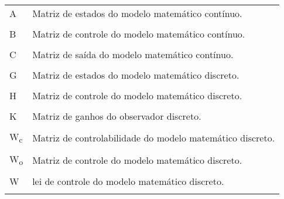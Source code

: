 \documentclass[a4paper,12pt]{article}
\begin{document}
\begin{tabular}{ l l }
A\hspace{1.5cm} & Matriz de estados do modelo matemático contínuo.\\
\phantom{a} & \phantom{a}\\
B\hspace{1.5cm} & Matriz de controle do modelo matemático contínuo.\\
\phantom{a} & \phantom{a}\\
C\hspace{1.5cm} & Matriz de saída do modelo matemático contínuo.\\
\phantom{a} & \phantom{a}\\
G\hspace{1.5cm} & Matriz de estados do modelo matemático discreto.\\
\phantom{a} & \phantom{a}\\
H\hspace{1.5cm} & Matriz de controle do modelo matemático discreto.\\
\phantom{a} & \phantom{a}\\
K\hspace{1.5cm} & Matriz de ganhos do observador discreto.\\
\phantom{a} & \phantom{a}\\
W\textsubscript{c}\hspace{1.5cm} & Matriz de controlabilidade do modelo matemático discreto.\\
\phantom{a} & \phantom{a}\\
W\textsubscript{o}\hspace{1.5cm} & Matriz de controle do modelo matemático discreto.\\
\phantom{a} & \phantom{a}\\
W\hspace{1.5cm} & lei de controle do modelo matemático discreto.\\
\phantom{a} & \phantom{a}\\

\end{tabular}

\newpage


\thispagestyle{empty}

\begin{center}
\listoffigures
\end{center}

\newpage

\end{document}
